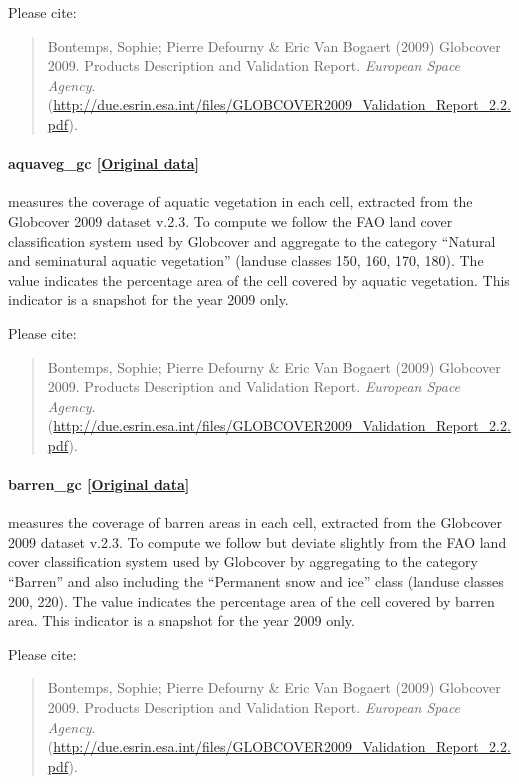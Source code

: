 \documentclass[]{book}
\begin{document}
Please cite:

\begin{quote}
Bontemps, Sophie; Pierre Defourny \& Eric Van Bogaert (2009) Globcover
2009. Products Description and Validation Report. \emph{European Space
Agency}.
(\url{http://due.esrin.esa.int/files/GLOBCOVER2009_Validation_Report_2.2.pdf}).
\end{quote}

\paragraph{aquaveg\_gc
{[}\href{http://due.esrin.esa.int/page_globcover.php}{Original
data}{]}}\label{aquaveg-gc}

measures the coverage of aquatic vegetation in each cell, extracted from
the Globcover 2009 dataset v.2.3. To compute  we
follow the FAO land cover classification system used by Globcover and
aggregate to the category ``Natural and seminatural aquatic vegetation''
(landuse classes 150, 160, 170, 180). The value indicates the percentage
area of the cell covered by aquatic vegetation. This indicator is a snapshot
for the year 2009 only.

Please cite:

\begin{quote}
Bontemps, Sophie; Pierre Defourny \& Eric Van Bogaert (2009) Globcover
2009. Products Description and Validation Report. \emph{European Space
Agency}.
(\url{http://due.esrin.esa.int/files/GLOBCOVER2009_Validation_Report_2.2.pdf}).
\end{quote}

\paragraph{barren\_gc
{[}\href{http://due.esrin.esa.int/page_globcover.php}{Original
data}{]}}\label{barren-gc}

measures the coverage of barren areas in each cell, extracted from the
Globcover 2009 dataset v.2.3. To compute  we follow
but deviate slightly from the FAO land cover classification system used
by Globcover by aggregating to the category ``Barren'' and also
including the ``Permanent snow and ice'' class (landuse classes 200,
220). The value indicates the percentage area of the cell covered by
barren area. This indicator is a snapshot for the year 2009 only.

Please cite:

\begin{quote}
Bontemps, Sophie; Pierre Defourny \& Eric Van Bogaert (2009) Globcover
2009. Products Description and Validation Report. \emph{European Space
Agency}.
(\url{http://due.esrin.esa.int/files/GLOBCOVER2009_Validation_Report_2.2.pdf}).
\end{quote}
\end{document}
